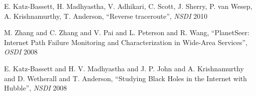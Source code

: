 \documentclass[12pt]{article}	%
\newenvironment{packed_enum}{
\begin{enumerate}
  \setlength{\itemsep}{1pt}
  \setlength{\parskip}{0pt}
  \setlength{\parsep}{0pt}
}{\end{enumerate}}
\begin{document}

\begin{packed_enum}
\item {\small E. Katz-Bassett, H. Madhyastha, V. Adhikari, C. Scott, J.
Sherry, P. van Wesep, A. Krishnamurthy, T. Anderson, ``Reverse traceroute'',
{\em NSDI} 2010 }
\item {\small M. Zhang and C. Zhang and V. Pai and L. Peterson and R. Wang, ``PlanetSeer: Internet Path Failure Monitoring
    and Characterization in Wide-Area Services'', {\em OSDI} 2008 }
\item { \small E. Katz-Bassett and H. V. Madhyastha and J. P. John and A. Krishnamurthy
       and D. Wetherall and T. Anderson, ``Studying Black Holes in the Internet with Hubble'',
{\em NSDI} 2008 }
\end{packed_enum}
\end{document}

